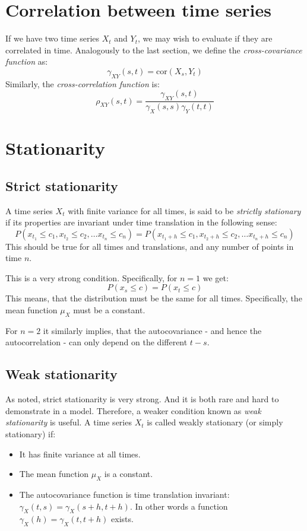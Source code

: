 \documentclass[12pt, a4paper]{article}
\numberwithin{equation}{section}
\begin{document}
\section{Correlation between time series}
If we have two time series $X_t$ and $Y_t$, we may wish to evaluate if they are correlated in time. Analogously to the last section, we define the \textit{cross-covariance function} as:
\begin{equation}
\gamma_{XY}(s,t)=\textrm{cor}(X_s,Y_t)
\end{equation}
Similarly, the \textit{cross-correlation function} is:
\begin{equation}
\rho_{XY}(s,t)=\frac{\gamma_{XY}(s,t)}{\gamma_X(s,s)\gamma_Y(t,t)}
\end{equation}

\section{Stationarity}

\subsection{Strict stationarity}
A time series $X_t$ with finite variance for all times, is said to be \textit{strictly stationary} if its properties are invariant under time translation in the following sense:
\begin{equation}
\label{strict_stationarity}
P(x_{t_1}\le c_1,x_{t_2}\le c_2,\ldots x_{t_n}\le c_n)=P(x_{t_1+h}\le c_1,x_{t_2+h}\le c_2,\ldots x_{t_n+h}\le c_n)
\end{equation}
This should be true for all times and translations, and any number of points in time $n$.

This is a very strong condition. Specifically, for $n=1$ we get:
\begin{equation}
P(x_s\le c)=P(x_t\le c)
\end{equation}
This means, that the distribution must be the same for all times. Specifically, the mean function $\mu_X$ must be a constant.

For $n=2$ it similarly implies, that the autocovariance - and hence the autocorrelation - can only depend on the different $t-s$.

\subsection{Weak stationarity}
As noted, strict stationarity is very strong. And it is both rare and hard to demonstrate in a model. Therefore, a weaker condition known as \textit{weak stationarity} is useful. A time series $X_t$ is called weakly stationary (or simply stationary) if:
\begin{itemize}
\item It has finite variance at all times.
\item The mean function $\mu_X$ is a constant.
\item The autocovariance function is time translation invariant: $\gamma_X(t,s)=\gamma_X(s+h,t+h)$. In other words a function $\gamma_X(h)=\gamma_X(t,t+h)$ exists.
\end{itemize}
\end{document}
